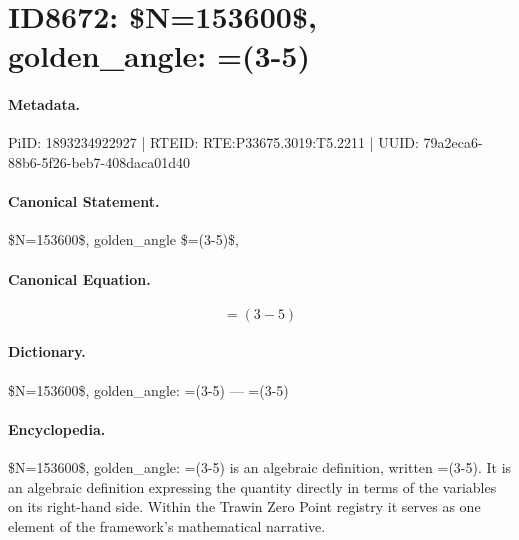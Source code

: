 \section*{ID8672: \$N=153600\$, golden\_angle: =(3-5)}
\paragraph{Metadata.}
PiID: 1893234922927 | RTEID: RTE:P33675.3019:T5.2211 | UUID: 79a2eca6-88b6-5f26-beb7-408daca01d40

\paragraph{Canonical Statement.}
\$N=153600\$, golden\_angle \$=(3-5)\$,

\paragraph{Canonical Equation.}
\[
=(3-5)
\]

\paragraph{Dictionary.}
\$N=153600\$, golden\_angle: =(3-5) — =(3-5)

\paragraph{Encyclopedia.}
\$N=153600\$, golden\_angle: =(3-5) is an algebraic definition, written =(3-5). It is an algebraic definition expressing the quantity directly in terms of the variables on its right-hand side. Within the Trawin Zero Point registry it serves as one element of the framework's mathematical narrative.
